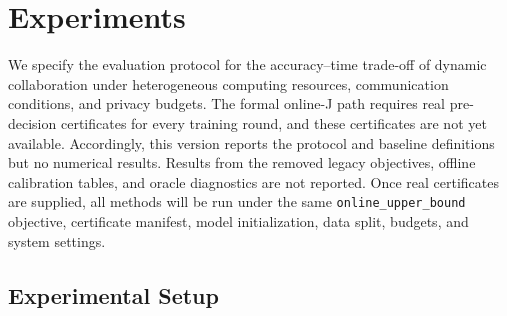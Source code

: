 \documentclass[5p,times]{elsarticle}
\theoremstyle{plain}
\theoremstyle{definition}
\theoremstyle{remark}
\begin{document}
\section{Experiments}
\label{sec:experiment}

We specify the evaluation protocol for the accuracy--time trade-off of
dynamic collaboration under heterogeneous computing resources,
communication conditions, and privacy budgets. The formal online-J path
requires real pre-decision certificates for every training round, and
these certificates are not yet available. Accordingly, this version
reports the protocol and baseline definitions but no numerical results.
Results from the removed legacy objectives, offline calibration tables,
and oracle diagnostics are not reported. Once real certificates are
supplied, all methods will be run under the same
\texttt{online\_upper\_bound} objective, certificate manifest, model
initialization, data split, budgets, and system settings.

\subsection{Experimental Setup}
\label{sec:exp_setup}
\end{document}
